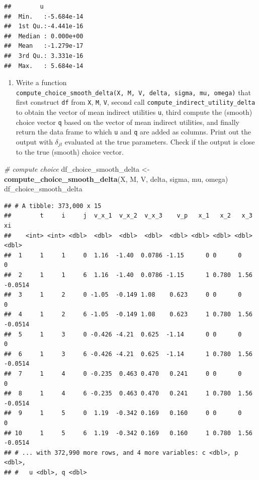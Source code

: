 \documentclass[]{book}
\newenvironment{Shaded}{\begin{snugshade}}{\end{snugshade}}
\newcommand{\KeywordTok}[1]{\textcolor[rgb]{0.13,0.29,0.53}{\textbf{#1}}}
\newcommand{\StringTok}[1]{\textcolor[rgb]{0.31,0.60,0.02}{#1}}
\newcommand{\CommentTok}[1]{\textcolor[rgb]{0.56,0.35,0.01}{\textit{#1}}}
\newcommand{\NormalTok}[1]{#1}
\providecommand{\tightlist}{%
  \setlength{\itemsep}{0pt}\setlength{\parskip}{0pt}}
\begin{document}
\begin{verbatim}
##        u             
##  Min.   :-5.684e-14  
##  1st Qu.:-4.441e-16  
##  Median : 0.000e+00  
##  Mean   :-1.279e-17  
##  3rd Qu.: 3.331e-16  
##  Max.   : 5.684e-14
\end{verbatim}

\begin{enumerate}
\def\labelenumi{\arabic{enumi}.}
\setcounter{enumi}{5}
\tightlist
\item
  Write a function
  \texttt{compute\_choice\_smooth\_delta(X,\ M,\ V,\ delta,\ sigma,\ mu,\ omega)}
  that first construct \texttt{df} from \texttt{X}, \texttt{M},
  \texttt{V}, second call \texttt{compute\_indirect\_utility\_delta} to
  obtain the vector of mean indirect utilities \texttt{u}, third compute
  the (smooth) choice vector \texttt{q} based on the vector of mean
  indirect utilities, and finally return the data frame to which
  \texttt{u} and \texttt{q} are added as columns. Print out the output
  with \(\delta_{jt}\) evaluated at the true parameters. Check if the
  output is close to the true (smooth) choice vector.
\end{enumerate}

\begin{Shaded}
\begin{Highlighting}[]
\CommentTok{# compute choice}
\NormalTok{df_choice_smooth_delta <-}\StringTok{ }
\StringTok{  }\KeywordTok{compute_choice_smooth_delta}\NormalTok{(X, M, V, delta, sigma, mu, omega)}
\NormalTok{df_choice_smooth_delta}
\end{Highlighting}
\end{Shaded}

\begin{verbatim}
## # A tibble: 373,000 x 15
##        t     i     j  v_x_1  v_x_2  v_x_3    v_p   x_1   x_2   x_3      xi
##    <int> <int> <dbl>  <dbl>  <dbl>  <dbl>  <dbl> <dbl> <dbl> <dbl>   <dbl>
##  1     1     1     0  1.16  -1.40  0.0786 -1.15      0 0      0     0     
##  2     1     1     6  1.16  -1.40  0.0786 -1.15      1 0.780  1.56 -0.0514
##  3     1     2     0 -1.05  -0.149 1.08    0.623     0 0      0     0     
##  4     1     2     6 -1.05  -0.149 1.08    0.623     1 0.780  1.56 -0.0514
##  5     1     3     0 -0.426 -4.21  0.625  -1.14      0 0      0     0     
##  6     1     3     6 -0.426 -4.21  0.625  -1.14      1 0.780  1.56 -0.0514
##  7     1     4     0 -0.235  0.463 0.470   0.241     0 0      0     0     
##  8     1     4     6 -0.235  0.463 0.470   0.241     1 0.780  1.56 -0.0514
##  9     1     5     0  1.19  -0.342 0.169   0.160     0 0      0     0     
## 10     1     5     6  1.19  -0.342 0.169   0.160     1 0.780  1.56 -0.0514
## # ... with 372,990 more rows, and 4 more variables: c <dbl>, p <dbl>,
## #   u <dbl>, q <dbl>
\end{verbatim}
\end{document}
